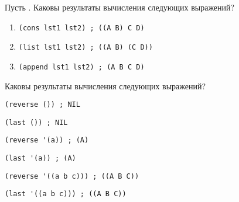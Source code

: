 \documentclass[a4paper,oneside,12pt]{extreport}
\begin{document}


\begin{task}
	Пусть .
	Каковы результаты вычисления следующих выражений?

	\begin{enumerate}
		\item \begin{lstlisting}[style=lispinline, gobble=24]
			(cons lst1 lst2) ; ((A B) C D)
		\end{lstlisting}

		\item \begin{lstlisting}[style=lispinline, gobble=24]
			(list lst1 lst2) ; ((A B) (C D))
		\end{lstlisting}

		\item \begin{lstlisting}[style=lispinline, gobble=24]
			(append lst1 lst2) ; (A B C D)
		\end{lstlisting}
	\end{enumerate}
\end{task}

\begin{task}
	Каковы результаты вычисления следующих выражений?

	\begin{AutoMultiColEnumerate}
		\item \begin{lstlisting}[style=lispinline, gobble=24]
			(reverse ()) ; NIL
		\end{lstlisting}

		\item \begin{lstlisting}[style=lispinline, gobble=24]
			(last ()) ; NIL
		\end{lstlisting}

		\item \begin{lstlisting}[style=lispinline, gobble=24]
			(reverse '(a)) ; (A)
		\end{lstlisting}

		\item \begin{lstlisting}[style=lispinline, gobble=24]
			(last '(a)) ; (A)
		\end{lstlisting}

		\item \begin{lstlisting}[style=lispinline, gobble=24]
			(reverse '((a b c))) ; ((A B C))
		\end{lstlisting}

		\item \begin{lstlisting}[style=lispinline, gobble=24]
			(last '((a b c))) ; ((A B C))
		\end{lstlisting}
	\end{AutoMultiColEnumerate}
\end{task}
\end{document}
